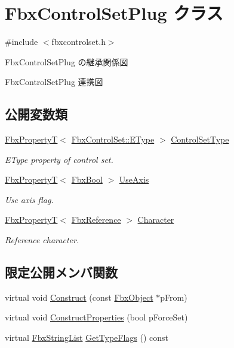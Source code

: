 \hypertarget{class_fbx_control_set_plug}{}\section{Fbx\+Control\+Set\+Plug クラス}
\label{class_fbx_control_set_plug}


{\ttfamily \#include $<$fbxcontrolset.\+h$>$}



Fbx\+Control\+Set\+Plug の継承関係図


Fbx\+Control\+Set\+Plug 連携図
\subsection*{公開変数類}
\begin{DoxyCompactItemize}
\item 
\hyperlink{class_fbx_property_t}{Fbx\+PropertyT}$<$ \hyperlink{class_fbx_control_set_a13a51702c46fff33d50c05d20f3d9f04}{Fbx\+Control\+Set\+::\+E\+Type} $>$ \hyperlink{class_fbx_control_set_plug_ac721dfc2da9b51b8a90c1df5f679e496}{Control\+Set\+Type}
\begin{DoxyCompactList}\small\item\em E\+Type property of control set. \end{DoxyCompactList}\item 
\hyperlink{class_fbx_property_t}{Fbx\+PropertyT}$<$ \hyperlink{fbxtypes_8h_a92e0562b2fe33e76a242f498b362262e}{Fbx\+Bool} $>$ \hyperlink{class_fbx_control_set_plug_a037aaf41be834256757d7bf874d7531b}{Use\+Axis}
\begin{DoxyCompactList}\small\item\em Use axis flag. \end{DoxyCompactList}\item 
\hyperlink{class_fbx_property_t}{Fbx\+PropertyT}$<$ \hyperlink{fbxtypes_8h_a44df6a2eec915cf27cd481e5c5e48a24}{Fbx\+Reference} $>$ \hyperlink{class_fbx_control_set_plug_ab6b2b323fb163f6c57121ff755fda602}{Character}
\begin{DoxyCompactList}\small\item\em Reference character. \end{DoxyCompactList}\end{DoxyCompactItemize}
\subsection*{限定公開メンバ関数}
\begin{DoxyCompactItemize}
\item 
virtual void \hyperlink{class_fbx_control_set_plug_a238ea564b568be5fadd03981570c2e47}{Construct} (const \hyperlink{class_fbx_object}{Fbx\+Object} $\ast$p\+From)
\item 
virtual void \hyperlink{class_fbx_control_set_plug_a9551bc59f788d2b0e44b7b8ba31188a6}{Construct\+Properties} (bool p\+Force\+Set)
\item 
virtual \hyperlink{class_fbx_string_list}{Fbx\+String\+List} \hyperlink{class_fbx_control_set_plug_a3111172be32f425f4d9b3bf281d2b4d2}{Get\+Type\+Flags} () const
\end{DoxyCompactItemize}
